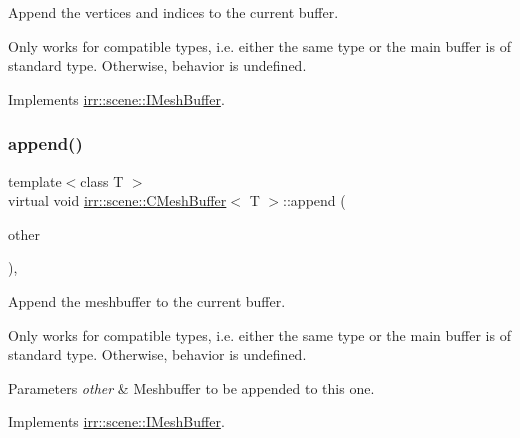 Append the vertices and indices to the current buffer. 

Only works for compatible types, i.\+e. either the same type or the main buffer is of standard type. Otherwise, behavior is undefined. 

Implements \hyperlink{classirr_1_1scene_1_1IMeshBuffer_ac9e9d7fbb10175cc6f1596ba3fe4e8f9}{irr\+::scene\+::\+I\+Mesh\+Buffer}.

\mbox{\label{classirr_1_1scene_1_1CMeshBuffer_af48b88e6c1bd79e6abd6a6803aa106c0}} 
\subsubsection{\texorpdfstring{append()}{append()}\hspace{0.1cm}{\footnotesize\ttfamily [2/2]}}
{\footnotesize\ttfamily template$<$class T $>$ \\
virtual void \hyperlink{classirr_1_1scene_1_1CMeshBuffer}{irr\+::scene\+::\+C\+Mesh\+Buffer}$<$ T $>$\+::append (\begin{DoxyParamCaption}\item[{const \hyperlink{classirr_1_1scene_1_1IMeshBuffer}{I\+Mesh\+Buffer} $\ast$const}]{other }\end{DoxyParamCaption})\hspace{0.3cm}{\ttfamily [inline]}, {\ttfamily [virtual]}}



Append the meshbuffer to the current buffer. 

Only works for compatible types, i.\+e. either the same type or the main buffer is of standard type. Otherwise, behavior is undefined. 
\begin{DoxyParams}{Parameters}
{\em other} & Meshbuffer to be appended to this one. \\
\hline
\end{DoxyParams}


Implements \hyperlink{classirr_1_1scene_1_1IMeshBuffer_a79d2737962579138183ed0fd324310b3}{irr\+::scene\+::\+I\+Mesh\+Buffer}.

\mbox{\label{classirr_1_1scene_1_1CMeshBuffer_a759863b44c024f79747019f492a5c7cf}} 

